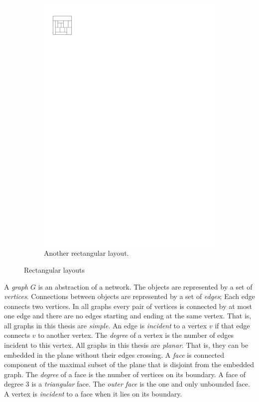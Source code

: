 \begin{figure}[b]
\begin{subfigure}[b]{0.45 \textwidth}
        \includegraphics[scale=1]{rectangularDuals/img/vertonesided}
        \caption{Another rectangular layout.}
        \label{fig:intr:vertonesided}
      \end{subfigure}
      \caption{Rectangular layouts}
      \label{fig:intr:graphs}
  \end{figure}

  A \emph{graph} $G$ is an abstraction of a network. The objects are represented by a set of \emph{vertices}.
  Connections between objects are represented by a set of \emph{edges}; Each edge connects two vertices. In all graphs every pair of vertices is connected by at most one edge and there are no edges starting and ending at the same vertex. That is, all graphs in this thesis are \emph{simple}. An edge is \emph{incident} to a vertex $v$ if that edge connects $v$ to another vertex. The \emph{degree} of a vertex is the number of edges incident to this vertex.
  All graphs in this thesis are \emph{planar}. That is, they can be embedded in the plane without their edges crossing. A \emph{face} is connected component of the maximal subset of the plane that is disjoint from the embedded graph. The \emph{degree} of a face is the number of vertices on its boundary. A face of degree $3$ is a \emph{triangular} face. The \emph{outer face} is the one and only unbounded face.
  A vertex is \emph{incident} to a face when it lies on its boundary.

